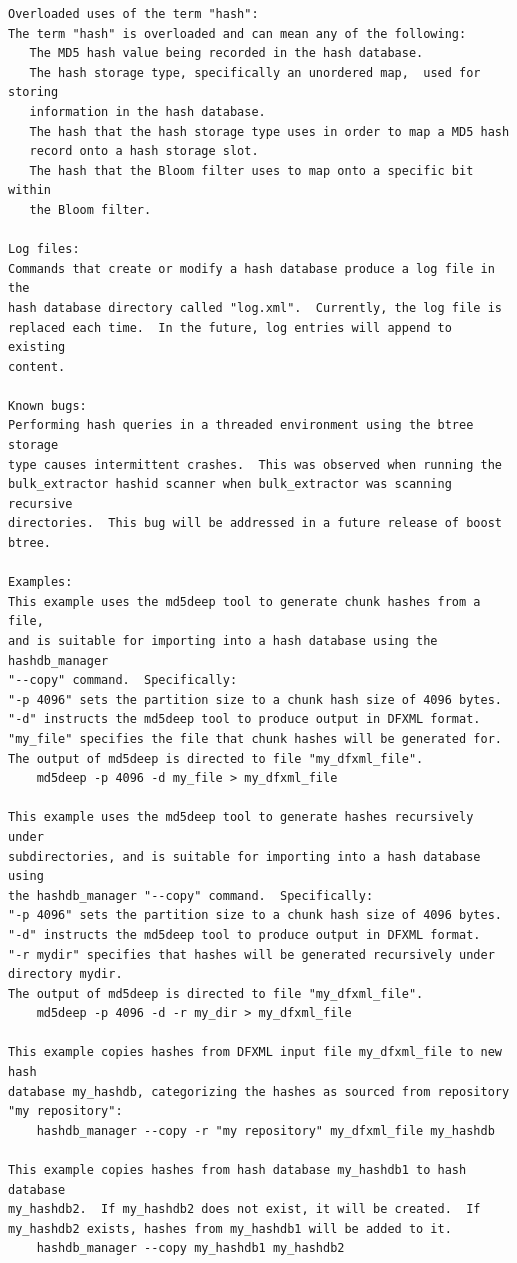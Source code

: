 \documentclass[11pt,twoside]{article}
\begin{document}
\begin{small}
\begin{verbatim}
Overloaded uses of the term "hash":
The term "hash" is overloaded and can mean any of the following:
   The MD5 hash value being recorded in the hash database.
   The hash storage type, specifically an unordered map,  used for storing
   information in the hash database.
   The hash that the hash storage type uses in order to map a MD5 hash
   record onto a hash storage slot.
   The hash that the Bloom filter uses to map onto a specific bit within
   the Bloom filter.

Log files:
Commands that create or modify a hash database produce a log file in the
hash database directory called "log.xml".  Currently, the log file is
replaced each time.  In the future, log entries will append to existing
content.

Known bugs:
Performing hash queries in a threaded environment using the btree storage
type causes intermittent crashes.  This was observed when running the
bulk_extractor hashid scanner when bulk_extractor was scanning recursive
directories.  This bug will be addressed in a future release of boost
btree.

Examples:
This example uses the md5deep tool to generate chunk hashes from a file,
and is suitable for importing into a hash database using the hashdb_manager
"--copy" command.  Specifically:
"-p 4096" sets the partition size to a chunk hash size of 4096 bytes.
"-d" instructs the md5deep tool to produce output in DFXML format.
"my_file" specifies the file that chunk hashes will be generated for.
The output of md5deep is directed to file "my_dfxml_file".
    md5deep -p 4096 -d my_file > my_dfxml_file

This example uses the md5deep tool to generate hashes recursively under
subdirectories, and is suitable for importing into a hash database using
the hashdb_manager "--copy" command.  Specifically:
"-p 4096" sets the partition size to a chunk hash size of 4096 bytes.
"-d" instructs the md5deep tool to produce output in DFXML format.
"-r mydir" specifies that hashes will be generated recursively under
directory mydir.
The output of md5deep is directed to file "my_dfxml_file".
    md5deep -p 4096 -d -r my_dir > my_dfxml_file

This example copies hashes from DFXML input file my_dfxml_file to new hash
database my_hashdb, categorizing the hashes as sourced from repository
"my repository":
    hashdb_manager --copy -r "my repository" my_dfxml_file my_hashdb

This example copies hashes from hash database my_hashdb1 to hash database
my_hashdb2.  If my_hashdb2 does not exist, it will be created.  If
my_hashdb2 exists, hashes from my_hashdb1 will be added to it.
    hashdb_manager --copy my_hashdb1 my_hashdb2


\end{verbatim}
\end{small}
\end{document}
